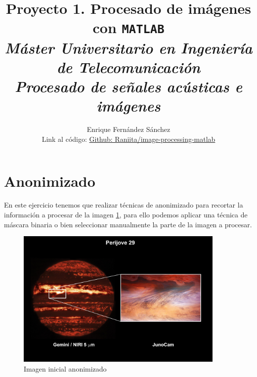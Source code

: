\documentclass[12pt]{article}
\begin{document}
	
	\title{Proyecto 1. Procesado de imágenes con \texttt{MATLAB} \\ \textit{\textbf{\large Máster Universitario en Ingeniería de Telecomunicación}} \\ \textit{\large Procesado de señales acústicas e imágenes}}
	\author{Enrique Fernández Sánchez \\ Link al código: \href{https://github.com/Raniita/image-processing-matlab}{Github: Raniita/image-processing-matlab}}
	
	\maketitle
	
	\vspace{120px}
	
	\tableofcontents
	
	\pagebreak
	
	\lstlistoflistings
	
	\listoffigures
	
	\pagebreak
	
	\section{Anonimizado}
	
	\noindent En este ejercicio tenemos que realizar técnicas de anonimizado para recortar la información a procesar de la imagen \ref{img: anonimizado src}, para ello podemos aplicar una técnica de máscara binaria o bien seleccionar manualmente la parte de la imagen a procesar.
	
	\begin{figure}[h]
		\begin{center}
			\includegraphics[width=0.9\textwidth]{img/anonimizado.jpg}
			\caption{Imagen inicial anonimizado}
			\label{img: anonimizado src}
		\end{center}
	\end{figure}
\end{document}
